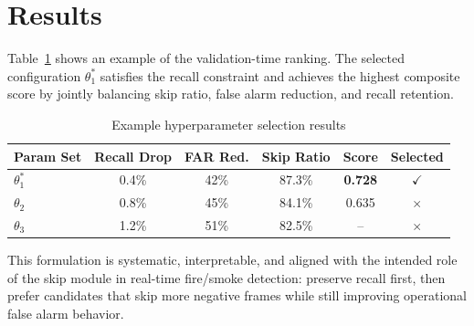 \documentclass{article}
\begin{document}
	\section{Results}

	Table~\ref{tab:skip-selection} shows an example of the validation-time ranking. The selected configuration $\theta_1^*$ satisfies the recall constraint and achieves the highest composite score by jointly balancing skip ratio, false alarm reduction, and recall retention.

	\begin{table}[htbp]
		\centering
		\caption{Example hyperparameter selection results}
		\label{tab:skip-selection}
		\begin{tabular}{lccccc}
			\toprule
			Param Set & Recall Drop & FAR Red. & Skip Ratio & Score & Selected \\
			\midrule
			$\theta_1^*$ & 0.4\% & 42\% & 87.3\% & \textbf{0.728} & $\checkmark$ \\
			$\theta_2$   & 0.8\% & 45\% & 84.1\% & 0.635 & $\times$ \\
			$\theta_3$   & 1.2\% & 51\% & 82.5\% & -- & $\times$ \\
			\bottomrule
		\end{tabular}
	\end{table}

	This formulation is systematic, interpretable, and aligned with the intended role of the skip module in real-time fire/smoke detection: preserve recall first, then prefer candidates that skip more negative frames while still improving operational false alarm behavior.
\end{document}
